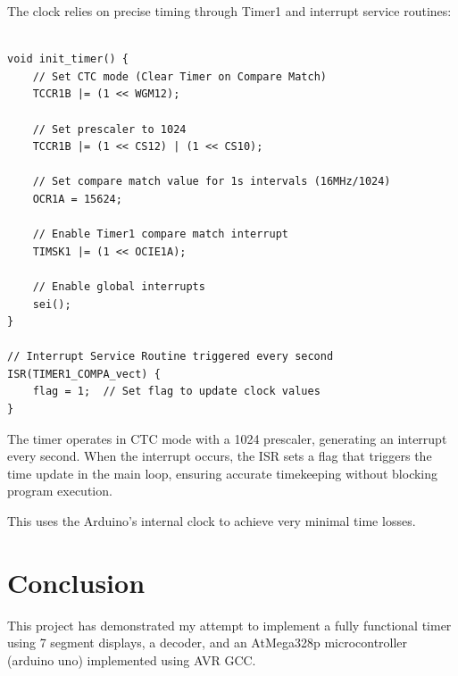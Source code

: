 \documentclass[a4paper,12pt]{article}
\begin{document}
The clock relies on precise timing through Timer1 and interrupt service routines:

\begin{verbatim}
    
void init_timer() {
    // Set CTC mode (Clear Timer on Compare Match)
    TCCR1B |= (1 << WGM12);
    
    // Set prescaler to 1024
    TCCR1B |= (1 << CS12) | (1 << CS10);

    // Set compare match value for 1s intervals (16MHz/1024)
    OCR1A = 15624;

    // Enable Timer1 compare match interrupt
    TIMSK1 |= (1 << OCIE1A);
    
    // Enable global interrupts
    sei();
}

// Interrupt Service Routine triggered every second
ISR(TIMER1_COMPA_vect) {
    flag = 1;  // Set flag to update clock values
}
\end{verbatim}

The timer operates in CTC mode with a 1024 prescaler, generating an interrupt every second. When the interrupt occurs, the ISR sets a flag that triggers the time update in the main loop, ensuring accurate timekeeping without blocking program execution.
\newline

This uses the Arduino's internal clock to achieve very minimal time losses.

\section*{Conclusion}
This project has demonstrated my attempt to implement a fully functional timer using 7 segment displays, a decoder, and an AtMega328p microcontroller (arduino uno) implemented using AVR GCC.
\end{document}
